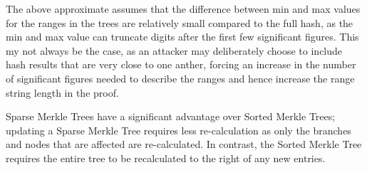 \documentclass[a4paper,12pt]{article}
\newcommand{\concatenate}{\mathbin{\|}}
\begin{document}
The above approximate assumes that the difference between min and max values for the ranges in the trees are relatively small compared to the full hash, as the min and max value can truncate digits after the first few significant figures. This my not always be the case, as an attacker may deliberately choose to include hash results that are very close to one anther, forcing an increase in the number of significant figures needed to describe the ranges and hence increase the range string length in the proof. 



Sparse Merkle Trees have a significant advantage over Sorted Merkle Trees; updating a Sparse Merkle Tree requires less re-calculation as only the branches and nodes that are affected are re-calculated. In contrast, the Sorted Merkle Tree requires the entire tree to be recalculated to the right of any new entries. 







\end{document}
